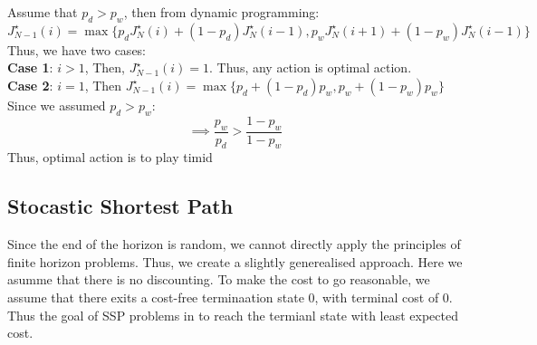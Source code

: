 \begin{example}
    Assume that \(p_d > p_w\), then from dynamic programming:
    \[
        J_{N-1} ^{\star} (i) = \max \{
            p_d J_N ^{\star} (i) + (1-p_d)J_N ^{\star} (i-1), p_w J_N ^{\star} (i+1) + (1-p_w)J_N ^{\star} (i-1)
            \}
    \] 
    Thus, we have two cases:\\
    \textbf{Case 1}: \(i > 1\), Then, \(J_{N-1}^{\star}(i) = 1\).
    Thus, any action is optimal action.\\
    \textbf{Case 2}: \(i = 1\), Then \(J_{N-1}^{\star}(i) = \max \{p_d + (1-p_d)p_w, p_w + (1-p_w)p_w \}\)\\
    Since we assumed \(p_d > p_w \):
    \[
        \implies \frac{p_w}{p_d} > \frac{1-p_w}{1-p_w}
    \]
    Thus, optimal action is to play timid
\end{example}

\subsection{Stocastic Shortest Path}
Since the end of the horizon is random, we cannot directly apply the principles of finite horizon
problems. Thus, we create a slightly generealised approach. Here we asumme that there is no discounting.
To make the cost to go reasonable, we assume that there exits a cost-free terminaation state \(0\), with 
terminal cost of 0. Thus the goal of SSP problems in to reach the termianl state with least expected cost. 

